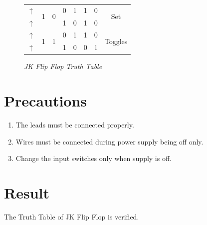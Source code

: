 \begin{figure}
\begin{tabular}{|c|cc|cccc|c|}
				$\uparrow$               & \multicolumn{1}{c|}{\multirow{2}{*}{1}} & \multirow{2}{*}{0} & \multicolumn{1}{c|}{0}   & \multicolumn{1}{c|}{1}              & \multicolumn{1}{c|}{1}   & 0              & \multirow{2}{*}{Set}       \\ \cline{1-1} \cline{4-7}
				$\uparrow$               & \multicolumn{1}{c|}{}                   &                    & \multicolumn{1}{c|}{1}   & \multicolumn{1}{c|}{0}              & \multicolumn{1}{c|}{1}   & 0              &                            \\ \hline
				$\uparrow$               & \multicolumn{1}{c|}{\multirow{2}{*}{1}} & \multirow{2}{*}{1} & \multicolumn{1}{c|}{0}   & \multicolumn{1}{c|}{1}              & \multicolumn{1}{c|}{1}   & 0              & \multirow{2}{*}{Toggles}   \\ \cline{1-1} \cline{4-7}
				$\uparrow$               & \multicolumn{1}{c|}{}                   &                    & \multicolumn{1}{c|}{1}   & \multicolumn{1}{c|}{0}              & \multicolumn{1}{c|}{0}   & 1              &                            \\ \hline
			\end{tabular}
	\label{fig:JK_flipflop_table}		
	\caption{\textit{JK Flip Flop Truth Table}}	
\end{figure}
\section{Precautions}
\begin{enumerate}
	\tightlist
	\item The leads must be connected properly.
	\item Wires must be connected during power supply being off only.
	\item Change the input switches only when supply is off.
\end{enumerate}

\section{Result}
The Truth Table of JK Flip Flop is verified.